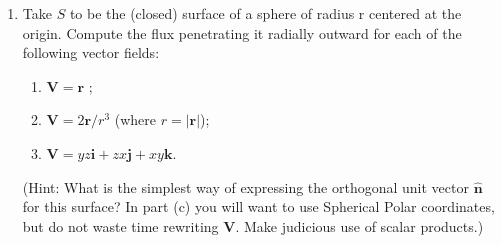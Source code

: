 \documentclass[fleqn]{article}
\begin{document}
\begin{enumerate}
    \item Take $S$ to be the (closed) surface of a sphere of radius r centered at the origin. Compute the flux penetrating it radially outward for each of the following vector fields:
      \begin{enumerate}
        \item $\mathbf{V}=\mathbf{r}$ ;
        \item $\mathbf{V}=2 \mathbf{r}/r^3$ (where $r=|\mathbf{r}|$); 
        \item $\mathbf{V}=yz\mathbf{i}+zx\mathbf{j}+xy\mathbf{k}$.
      \end{enumerate}
      (Hint: What is the simplest way of expressing the orthogonal unit vector $\mathbf{\hat n}$ for this surface? In part (c) you will want to use Spherical Polar coordinates, but do not waste time rewriting $\mathbf{V}$. Make judicious use of scalar products.)

  \end{enumerate}
\end{document}
